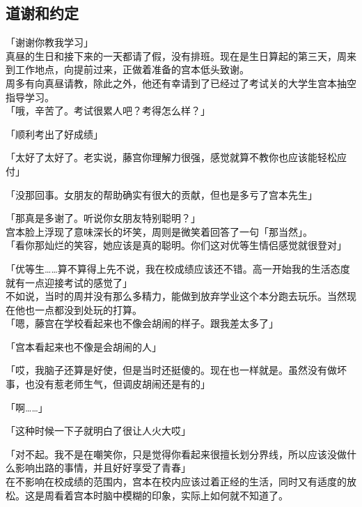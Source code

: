 \subsection{道谢和约定}

「谢谢你教我学习」\\

真昼的生日和接下来的一天都请了假，没有排班。现在是生日算起的第三天，周来到工作地点，向提前过来，正做着准备的宫本低头致谢。\\

周多有向真昼请教，除此之外，他还有幸请到了已经过了考试关的大学生宫本抽空指导学习。\\

「哦，辛苦了。考试很累人吧？考得怎么样？」

「顺利考出了好成绩」

「太好了太好了。老实说，藤宫你理解力很强，感觉就算不教你也应该能轻松应付」

「没那回事。女朋友的帮助确实有很大的贡献，但也是多亏了宫本先生」

「那真是多谢了。听说你女朋友特别聪明？」\\

宫本脸上浮现了意味深长的坏笑，周则是微笑着回答了一句「那当然」。\\

「看你那灿烂的笑容，她应该是真的聪明。你们这对优等生情侣感觉就很登对」

「优等生……算不算得上先不说，我在校成绩应该还不错。高一开始我的生活态度就有一点迎接考试的感觉了」\\

不如说，当时的周并没有那么多精力，能做到放弃学业这个本分跑去玩乐。当然现在他也一点都没到处玩的打算。\\

「嗯，藤宫在学校看起来也不像会胡闹的样子。跟我差太多了」

「宫本看起来也不像是会胡闹的人」

「哎，我脑子还算是好使，但是当时还挺傻的。现在也一样就是。虽然没有做坏事，也没有惹老师生气，但调皮胡闹还是有的」

「啊……」

「这种时候一下子就明白了很让人火大哎」

「对不起。我不是在嘲笑你，只是觉得你看起来很擅长划分界线，所以应该没做什么影响出路的事情，并且好好享受了青春」\\

在不影响在校成绩的范围内，宫本在校内应该过着正经的生活，同时又有适度的放松。这是周看着宫本时脑中模糊的印象，实际上如何就不知道了。

